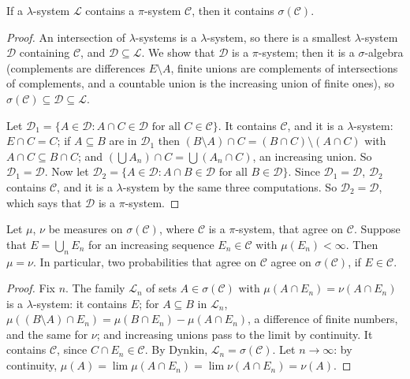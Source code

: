 \begin{theorem}\label{thm:dynkin}
If a $\lambda$-system $\mathcal L$ contains a $\pi$-system $\mathcal C$, then it contains $\sigma(\mathcal C)$.
\end{theorem}
\begin{proof}
An intersection of $\lambda$-systems is a $\lambda$-system, so there is a smallest $\lambda$-system $\mathcal D$ containing $\mathcal C$, and $\mathcal D\subseteq\mathcal L$.
We show that $\mathcal D$ is a $\pi$-system; then it is a $\sigma$-algebra (complements are differences $E\setminus A$, finite unions
are complements of intersections of complements, and a countable union is the increasing union of finite ones),
so $\sigma(\mathcal C)\subseteq\mathcal D\subseteq\mathcal L$.

Let $\mathcal D_1=\{A\in\mathcal D:A\cap C\in\mathcal D\text{ for all }C\in\mathcal C\}$. It contains $\mathcal C$, and it is a $\lambda$-system: $E\cap C=C$; if $A\subseteq B$ are in
$\mathcal D_1$ then $(B\setminus A)\cap C=(B\cap C)\setminus(A\cap C)$ with $A\cap C\subseteq B\cap C$; and $(\bigcup A_n)\cap C=\bigcup(A_n\cap C)$, an increasing union. So
$\mathcal D_1=\mathcal D$. Now let $\mathcal D_2=\{A\in\mathcal D:A\cap B\in\mathcal D\text{ for all }B\in\mathcal D\}$. Since $\mathcal D_1=\mathcal D$, $\mathcal D_2$ contains $\mathcal C$, and it is a
$\lambda$-system by the same three computations. So $\mathcal D_2=\mathcal D$, which says that $\mathcal D$ is a $\pi$-system.
\end{proof}

\begin{theorem}\label{thm:uniqueness}
Let $\mu$, $\nu$ be measures on $\sigma(\mathcal C)$, where $\mathcal C$ is a $\pi$-system, that agree on $\mathcal C$. Suppose that $E=\bigcup_nE_n$ for an
increasing sequence $E_n\in\mathcal C$ with $\mu(E_n)<\infty$. Then $\mu=\nu$. In particular, two probabilities that agree on $\mathcal C$ agree
on $\sigma(\mathcal C)$, if $E\in\mathcal C$.
\end{theorem}
\begin{proof}
Fix $n$. The family $\mathcal L_n$ of sets $A\in\sigma(\mathcal C)$ with $\mu(A\cap E_n)=\nu(A\cap E_n)$ is a $\lambda$-system: it contains $E$; for $A\subseteq B$ in $\mathcal L_n$,
$\mu((B\setminus A)\cap E_n)=\mu(B\cap E_n)-\mu(A\cap E_n)$, a difference of finite numbers, and the same for $\nu$; and increasing unions pass
to the limit by continuity. It contains $\mathcal C$, since $C\cap E_n\in\mathcal C$. By Dynkin, $\mathcal L_n=\sigma(\mathcal C)$. Let $n\to\infty$: by continuity,
$\mu(A)=\lim\mu(A\cap E_n)=\lim\nu(A\cap E_n)=\nu(A)$.
\end{proof}


